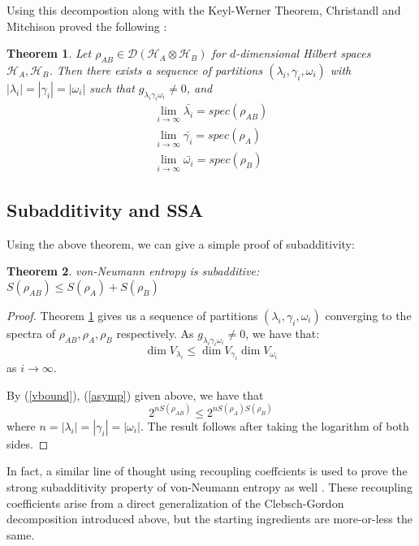 \documentclass[12pt]{article}%
\newtheorem{thm}{Theorem}
\begin{document}
\noindent Using this decompostion along with the Keyl-Werner Theorem, Christandl and Mitchison proved the following \cite{CM}:

\begin{thm} \label{converge}
  Let $\rho_{AB} \in \mathcal{D}(\mathcal{H}_A \otimes \mathcal{H}_B)$ for $d$-dimensional Hilbert spaces $\mathcal{H}_A, \mathcal{H}_B$. Then there exists a sequence of partitions $(\lambda_i, \gamma_i, \omega_i)$ with $|\lambda_i| = |\gamma_i| = |\omega_i|$ such that $g_{\lambda_i\gamma_i\omega_i} \neq 0$, and
  \begin{gather*}
    \lim_{i \rightarrow \infty} \bar{\lambda_i} = spec(\rho_{AB}) \\
    \lim_{i \rightarrow \infty} \bar{\gamma_i} = spec(\rho_A) \\
    \lim_{i \rightarrow \infty} \bar{\omega_i} =  spec(\rho_B)
  \end{gather*}
\end{thm}
\subsection{Subadditivity and SSA}

\noindent Using the above theorem, we can give a simple proof of subadditivity:
\begin{thm}
  von-Neumann entropy is subadditive: $S(\rho_{AB}) \leq S(\rho_A) + S(\rho_B)$
\end{thm}
\begin{proof}
  Theorem \ref{converge} gives us a sequence of partitions $(\lambda_i,\gamma_i, \omega_i)$ converging to the spectra of $\rho_{AB}, \rho_A, \rho_B$ respectively. As $g_{\lambda_i\gamma_i\omega_i} \neq 0$, we have that:
  $$ \dim{V_{\lambda_i}} \leq \dim{V_{\gamma_i}}\dim{V_{\omega_i}} $$ as $i \rightarrow \infty$.

  \noindent By (\ref{vbound}), (\ref{asymp}) given above, we have that
  $$2^{nS(\rho_{AB})} \leq 2^{nS(\rho_A)S(\rho_B)}$$
  where $n = |\lambda_i| = |\gamma_i| = |\omega_i|$. The result follows after taking the logarithm of both sides.
\end{proof}

In fact, a similar line of thought using recoupling coeffcients is used to prove the strong subadditivity property of von-Neumann entropy as well \cite{CSW}. These recoupling coefficients arise from a direct generalization of the Clebsch-Gordon decomposition introduced above, but the starting ingredients are more-or-less the same.

\newpage


\end{document}
